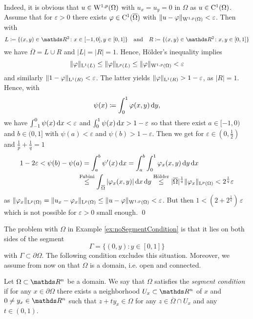 \begin{ex}[Exercise]
  Indeed, it is obvious that $u \in \mathrm{W}^{1,p}(\Omega)$ with $u_x = u_y = 0$ in $\Omega$ as $u \in \mathrm{C}^1(\Omega)$.
  Assume that for $\varepsilon > 0$ there exists $\varphi \in \mathrm{C}^1(\overline\Omega)$ with $\| u - \varphi\|_{\mathrm{W}^{1,p}(\Omega)} < \varepsilon$.
  Then with
    $$
    L \coloneqq \{ (x,y) \in \R^2 \colon x \in [-1,0], y \in [0,1] \} \quad\text{and}\quad
    R \coloneqq \{ (x,y) \in \R^2 \colon x, y \in [0,1] \}
    $$
    we have $\overline\Omega = L \cup R$ and $|L| = |R| = 1$.
    Hence, Hölder's inequality implies
    $$
    \|\varphi\|_{\mathrm{L}^1(L)} 
    \leq \|\varphi\|_{\mathrm{L}^p(L)}
    \leq \|\varphi\|_{\mathrm{W}^{1,p}(\Omega)}
    < \varepsilon
    $$
    and similarly $\|1 - \varphi\|_{\mathrm{L}^1(R)} < \varepsilon$.
    The latter yields $\|\varphi\|_{\mathrm{L}^1(R)} > 1 - \varepsilon$, as $|R| = 1$.
    Hence, with
    $$
    \psi(x) \coloneqq \int_0^1 \varphi(x,y) \, {\operatorname{d}\!{y}},
    $$
    we have $\int_{-1}^0 \psi(x) \, {\operatorname{d}\!{x}} < \varepsilon$ and $\int_0^1 \psi(x) \, {\operatorname{d}\!{x}} > 1 - \varepsilon$ so that there exist $a \in [-1,0)$ and $b \in (0,1]$ with $\psi(a) < \varepsilon$ and $\psi(b) > 1 - \varepsilon$.
    Then we get for $\varepsilon \in (0,\frac{1}{2})$ and $\frac{1}{p} + \frac{1}{q} = 1$
    \begin{align*}
      1 - 2\varepsilon
      < \psi(b) - \psi(a)
      &= \int_a^b \psi'(x) \d x
      =\int_a^b \int_0^1 \varphi_x(x,y) \d y \d x \\
      &\hspace{-0.7em}\overset{\text{Fubini}}{\leq} \int_{\,\overline\Omega} |\varphi_x (x,y)| \d x \d y
      \overset{\text{Hölder}}{\leq} |\overline\Omega|^{\frac{1}{q}} \|\varphi_x\|_{\Ell^p(\Omega)}
      < 2^{\frac{1}{q}}\varepsilon
    \end{align*}
    as $\|\varphi_x\|_{\mathrm{L}^p(\Omega)} = \| u_x - \varphi_x\|_{\mathrm{L}^p(\Omega)} \leq \|u - \varphi\|_{\mathrm{W}^{1,p}(\Omega)} < \varepsilon$.
    But then $1 < (2 + 2^{\frac{1}{q}})\, \varepsilon$ which is not possible for $\varepsilon > 0$ small enough.  \qed
\end{ex}

The problem with $\Omega$ in Example \ref{ex:noSegmentCondition} is that it lies on both sides of the segment $$\Gamma = \{(0,y) \colon y \in [0,1]\}$$ with $\Gamma \subset \partial \Omega$.
The following condition excludes this situation.
Moreover, we assume from now on that $\Omega$ is a domain, i.e. open and connected.

\begin{defn}
  \label{defn:segmentCond}
  Let $\Omega \subset \R^n$ be a domain.
  We say that $\Omega$ satisfies the \emph{segment condition} if for any $x \in \partial\Omega$ there exists a neighborhood $U_x \subset \R^n$ of $x$ and $0 \neq y_x \in \R^n$ such that $z + t y_x \in \Omega$ for any $z \in \overline\Omega \cap U_x$ and any $t \in (0,1)$.
\end{defn}

